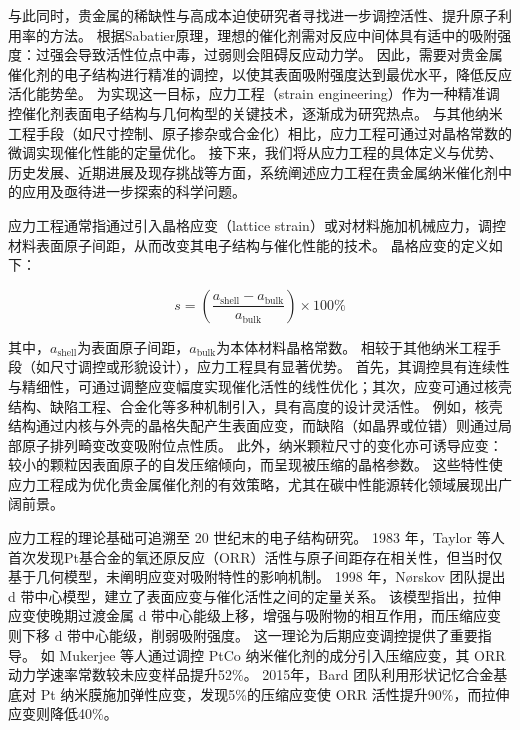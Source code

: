 与此同时，贵金属的稀缺性与高成本迫使研究者寻找进一步调控活性、提升原子利用率的方法。
根据Sabatier原理，理想的催化剂需对反应中间体具有适中的吸附强度：过强会导致活性位点中毒，过弱则会阻碍反应动力学\cite{Hu_2021}。
因此，需要对贵金属催化剂的电子结构进行精准的调控，以使其表面吸附强度达到最优水平，降低反应活化能势垒。
为实现这一目标，应力工程（strain
engineering）作为一种精准调控催化剂表面电子结构与几何构型的关键技术，逐渐成为研究热点。
与其他纳米工程手段（如尺寸控制、原子掺杂或合金化）相比，应力工程可通过对晶格常数的微调实现催化性能的定量优化\cite{Hammer_2000}。
接下来，我们将从应力工程的具体定义与优势、历史发展、近期进展及现存挑战等方面，系统阐述应力工程在贵金属纳米催化剂中的应用及亟待进一步探索的科学问题。

应力工程通常指通过引入晶格应变（lattice
strain）或对材料施加机械应力，调控材料表面原子间距，从而改变其电子结构与催化性能的技术。
晶格应变的定义如下：

$$
	s = \left( \frac{a_{\text{shell}} - a_{\text{bulk}}}{a_{\text{bulk}}} \right) \times 100\%
$$

其中，$a_\text{shell}$为表面原子间距，$a_\text{bulk}$为本体材料晶格常数。
相较于其他纳米工程手段（如尺寸调控或形貌设计），应力工程具有显著优势。
首先，其调控具有连续性与精细性，可通过调整应变幅度实现催化活性的线性优化\cite{Hammer_2000,Strasser_2010}；其次，应变可通过核壳结构、缺陷工程、合金化等多种机制引入，具有高度的设计灵活性\cite{Chen_2024,Hou_2023,Maiti_2021}。
例如，核壳结构通过内核与外壳的晶格失配产生表面应变\cite{Strasser_2010,Xue_2021,Bu_2016,Moseley_2015,E_2018}，而缺陷（如晶界或位错）则通过局部原子排列畸变改变吸附位点性质\cite{Zhang_2021,Zhao_2021}。
此外，纳米颗粒尺寸的变化亦可诱导应变：较小的颗粒因表面原子的自发压缩倾向，而呈现被压缩的晶格参数\cite{Beyerlein_2012}。
这些特性使应力工程成为优化贵金属催化剂的有效策略，尤其在碳中性能源转化领域展现出广阔前景\cite{Chen_2024}。

应力工程的理论基础可追溯至 20 世纪末的电子结构研究。
1983 年，Taylor 等人首次发现Pt基合金的氧还原反应（ORR）活性与原子间距存在相关性，但当时仅基于几何模型，未阐明应变对吸附特性的影响机制\cite{Jalan_1983}。
1998 年，Nørskov 团队提出 d 带中心模型，建立了表面应变与催化活性之间的定量关系\cite{Mavrikakis_1998,Hammer_1995}。
该模型指出，拉伸应变使晚期过渡金属 d 带中心能级上移，增强与吸附物的相互作用，而压缩应变则下移 d 带中心能级，削弱吸附强度。
这一理论为后期应变调控提供了重要指导。
如 Mukerjee 等人通过调控 PtCo 纳米催化剂的成分引入压缩应变，其 ORR 动力学速率常数较未应变样品提升52\%\cite{Jia_2015}。
2015年，Bard 团队利用形状记忆合金基底对 Pt 纳米膜施加弹性应变，发现5\%的压缩应变使 ORR 活性提升90\%，而拉伸应变则降低40\%\cite{Du_2015}。

